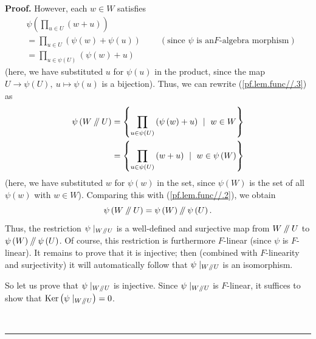 \documentclass[numbers=enddot,12pt,final,onecolumn,notitlepage]{scrartcl}%
\numberwithin{exer}{section}
\theoremstyle{definition}
\newenvironment{proof}[1][Proof]{\noindent\textbf{#1.} }{\ \rule{0.5em}{0.5em}}
\let\prodnonlimits\prod
\renewcommand{\prod}{\prodnonlimits\limits}
\newcommand{\sslash}{\mathbin{/\mkern-5mu/}}
\theoremstyle{plainsl}
\begin{document}
\begin{proof}
However, each $w\in W$ satisfies
\begin{align*}
&  \psi\left(  \prod_{u\in U}\left(  w+u\right)  \right) \\
&  =\prod_{u\in U}\left(  \psi\left(  w\right)  +\psi\left(  u\right)
\right)  \ \ \ \ \ \ \ \ \ \ \left(  \text{since }\psi\text{ is an
}F\text{-algebra morphism}\right) \\
&  =\prod_{u\in\psi\left(  U\right)  }\left(  \psi\left(  w\right)  +u\right)
\end{align*}
(here, we have substituted $u$ for $\psi\left(  u\right)  $ in the product,
since the map $U\rightarrow\psi\left(  U\right)  ,\ u\mapsto\psi\left(
u\right)  $ is a bijection). Thus, we can rewrite (\ref{pf.lem.func//.3}) as%
\begin{align*}
\psi\left(  W\sslash U\right)   &  =\left\{  \prod_{u\in\psi\left(  U\right)
}\left(  \psi\left(  w\right)  +u\right)  \ \mid\ w\in W\right\} \\
&  =\left\{  \prod_{u\in\psi\left(  U\right)  }\left(  w+u\right)
\ \mid\ w\in\psi\left(  W\right)  \right\}
\end{align*}
(here, we have substituted $w$ for $\psi\left(  w\right)  $ in the set, since
$\psi\left(  W\right)  $ is the set of all $\psi\left(  w\right)  $ with $w\in
W$). Comparing this with (\ref{pf.lem.func//.2}), we obtain%
\[
\psi\left(  W\sslash U\right)  =\psi\left(  W\right)  \sslash \psi\left(
U\right)  .
\]
Thus, the restriction $\psi\mid_{W\sslash U}$ is a well-defined and surjective
map from $W\sslash U$ to $\psi\left(  W\right)  \sslash \psi\left(  U\right)
$. Of course, this restriction is furthermore $F$-linear (since $\psi$ is
$F$-linear). It remains to prove that it is injective; then (combined with
$F$-linearity and surjectivity) it will automatically follow that $\psi
\mid_{W\sslash U}$ is an isomorphism.

So let us prove that $\psi\mid_{W\sslash U}$ is injective. Since $\psi
\mid_{W\sslash U}$ is $F$-linear, it suffices to show that
$\operatorname*{Ker}\left(  \psi\mid_{W\sslash U}\right)  =0$.


\end{proof}
\end{document}
